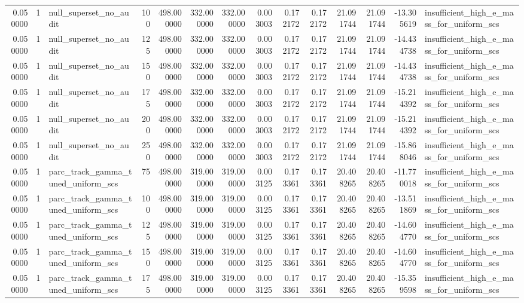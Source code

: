\begin{tabular}{rrlrrrrrrrrrrl}
0.050000 & 1 & null_superset_no_audit & 100 & 498.000000 & 332.000000 & 332.000000 & 0.003003 & 0.172172 & 0.172172 & 21.091744 & 21.091744 & -13.305619 & insufficient_high_e_mass_for_uniform_scs \\
0.050000 & 1 & null_superset_no_audit & 125 & 498.000000 & 332.000000 & 332.000000 & 0.003003 & 0.172172 & 0.172172 & 21.091744 & 21.091744 & -14.434738 & insufficient_high_e_mass_for_uniform_scs \\
0.050000 & 1 & null_superset_no_audit & 150 & 498.000000 & 332.000000 & 332.000000 & 0.003003 & 0.172172 & 0.172172 & 21.091744 & 21.091744 & -14.434738 & insufficient_high_e_mass_for_uniform_scs \\
0.050000 & 1 & null_superset_no_audit & 175 & 498.000000 & 332.000000 & 332.000000 & 0.003003 & 0.172172 & 0.172172 & 21.091744 & 21.091744 & -15.214392 & insufficient_high_e_mass_for_uniform_scs \\
0.050000 & 1 & null_superset_no_audit & 200 & 498.000000 & 332.000000 & 332.000000 & 0.003003 & 0.172172 & 0.172172 & 21.091744 & 21.091744 & -15.214392 & insufficient_high_e_mass_for_uniform_scs \\
0.050000 & 1 & null_superset_no_audit & 250 & 498.000000 & 332.000000 & 332.000000 & 0.003003 & 0.172172 & 0.172172 & 21.091744 & 21.091744 & -15.868046 & insufficient_high_e_mass_for_uniform_scs \\
0.050000 & 1 & parc_track_gamma_tuned_uniform_scs & 75 & 498.000000 & 319.000000 & 319.000000 & 0.003125 & 0.173361 & 0.173361 & 20.408265 & 20.408265 & -11.770018 & insufficient_high_e_mass_for_uniform_scs \\
0.050000 & 1 & parc_track_gamma_tuned_uniform_scs & 100 & 498.000000 & 319.000000 & 319.000000 & 0.003125 & 0.173361 & 0.173361 & 20.408265 & 20.408265 & -13.511869 & insufficient_high_e_mass_for_uniform_scs \\
0.050000 & 1 & parc_track_gamma_tuned_uniform_scs & 125 & 498.000000 & 319.000000 & 319.000000 & 0.003125 & 0.173361 & 0.173361 & 20.408265 & 20.408265 & -14.604770 & insufficient_high_e_mass_for_uniform_scs \\
0.050000 & 1 & parc_track_gamma_tuned_uniform_scs & 150 & 498.000000 & 319.000000 & 319.000000 & 0.003125 & 0.173361 & 0.173361 & 20.408265 & 20.408265 & -14.604770 & insufficient_high_e_mass_for_uniform_scs \\
0.050000 & 1 & parc_track_gamma_tuned_uniform_scs & 175 & 498.000000 & 319.000000 & 319.000000 & 0.003125 & 0.173361 & 0.173361 & 20.408265 & 20.408265 & -15.359598 & insufficient_high_e_mass_for_uniform_scs \\

\end{tabular}
